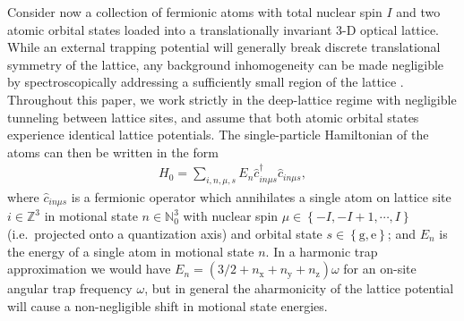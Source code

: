 \documentclass[preprint,showkeys,nofootinbib]{revtex4-1}
\newcommand{\p}[1]{\left(#1\right)} %
\renewcommand{\set}[1]{\left\{#1\right\}} %
\newcommand{\g}{\text{g}}
\newcommand{\e}{\text{e}}
\newcommand{\x}{\text{x}}
\newcommand{\y}{\text{y}}
\newcommand{\z}{\text{z}}
\renewcommand{\c}{\hat{c}}
\newcommand{\1}{\mathds{1}}
\begin{document}
Consider now a collection of fermionic atoms with total nuclear spin
$I$ and two atomic orbital states loaded into a translationally
invariant 3-D optical lattice.  While an external trapping potential
will generally break discrete translational symmetry of the lattice,
any background inhomogeneity can be made negligible by
spectroscopically addressing a sufficiently small region of the
lattice \cite{goban2018emergence}.  Throughout this paper, we work
strictly in the deep-lattice regime with negligible tunneling between
lattice sites, and assume that both atomic orbital states experience
identical lattice potentials.  The single-particle Hamiltonian of the
atoms can then be written in the form
\begin{align}
  H_0 = \sum_{i,n,\mu,s} E_n \c_{in\mu s}^\dag \c_{in\mu s},
  \label{eq:H_0}
\end{align}
where $\c_{in\mu s}$ is a fermionic operator which annihilates a
single atom on lattice site $i\in\mathbb{Z}^3$ in motional state
$n\in\mathbb{N}_0^3$ with nuclear spin $\mu\in\set{-I,-I+1,\cdots,I}$
(i.e.~projected onto a quantization axis) and orbital state
$s\in\set{\g,\e}$; and $E_n$ is the energy of a single atom in
motional state $n$.  In a harmonic trap approximation we would have
$E_n=\p{3/2+n_\x+n_\y+n_\z}\omega$ for an on-site angular trap
frequency $\omega$, but in general the aharmonicity of the lattice
potential will cause a non-negligible shift in motional state
energies.
\end{document}

